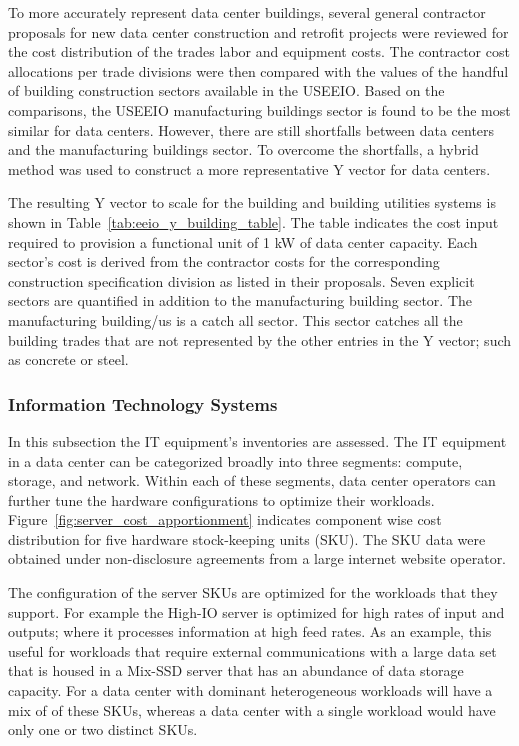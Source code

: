         To more accurately represent data center buildings, several general contractor proposals for new data center construction and retrofit projects were reviewed for the cost distribution of the trades labor and equipment costs.  The contractor cost allocations per trade divisions were then compared with the values of the handful of building construction sectors available in the USEEIO. Based on the comparisons, the USEEIO manufacturing buildings sector is found to be the most similar for data centers. However, there are still shortfalls between data centers and the manufacturing buildings sector. To overcome the shortfalls, a hybrid method was used to construct a more representative Y vector for data centers. 
        
        The resulting Y vector to scale for the building and building utilities systems is shown in Table~\ref{tab:eeio_y_building_table}. The table indicates the cost input required to provision a functional unit of 1 kW of data center capacity. Each sector's cost is derived from the contractor costs for the corresponding construction specification division as listed  in their proposals. Seven explicit sectors are quantified in addition to the manufacturing building sector. The manufacturing building/us is a catch all sector. This sector catches all the building trades that are not represented by the other entries in the Y vector; such as concrete or steel. 
        
        
        
        \subsubsection{Information Technology Systems}
        
        In this subsection the IT equipment's inventories are assessed. The IT equipment in a data center can be categorized broadly into three segments: compute, storage, and network. Within each of these segments, data center operators can further tune the hardware configurations to optimize their workloads. Figure~\ref{fig:server_cost_apportionment} indicates component wise cost distribution for five hardware stock-keeping units (SKU). The SKU data were obtained under non-disclosure agreements from a large internet website operator.  
        
        
        
        The configuration of the server SKUs are optimized for the workloads that they support. For example the High-IO server is optimized for high rates of input and outputs; where it processes information at high feed rates. As an example, this useful for workloads that require external communications with a large data set that is housed in a Mix-SSD server that has an abundance of data storage capacity. For a data center with dominant heterogeneous workloads will have a mix of of these SKUs, whereas a data center with a single workload would have only one or two distinct SKUs.
        
